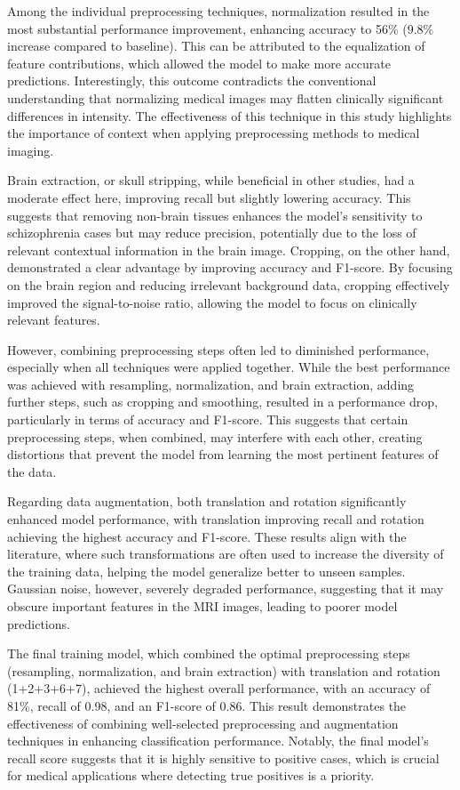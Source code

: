 Among the individual preprocessing techniques, normalization resulted in the most substantial performance improvement, enhancing accuracy to 56\% (9.8\% increase compared to baseline). This can be attributed to the equalization of feature contributions, which allowed the model to make more accurate predictions. Interestingly, this outcome contradicts the conventional understanding that normalizing medical images may flatten clinically significant differences in intensity. The effectiveness of this technique in this study highlights the importance of context when applying preprocessing methods to medical imaging.

Brain extraction, or skull stripping, while beneficial in other studies, had a moderate effect here, improving recall but slightly lowering accuracy. This suggests that removing non-brain tissues enhances the model's sensitivity to schizophrenia cases but may reduce precision, potentially due to the loss of relevant contextual information in the brain image. Cropping, on the other hand, demonstrated a clear advantage by improving accuracy and F1-score. By focusing on the brain region and reducing irrelevant background data, cropping effectively improved the signal-to-noise ratio, allowing the model to focus on clinically relevant features.

However, combining preprocessing steps often led to diminished performance, especially when all techniques were applied together. While the best performance was achieved with resampling, normalization, and brain extraction, adding further steps, such as cropping and smoothing, resulted in a performance drop, particularly in terms of accuracy and F1-score. This suggests that certain preprocessing steps, when combined, may interfere with each other, creating distortions that prevent the model from learning the most pertinent features of the data.

Regarding data augmentation, both translation and rotation significantly enhanced model performance, with translation improving recall and rotation achieving the highest accuracy and F1-score. These results align with the literature, where such transformations are often used to increase the diversity of the training data, helping the model generalize better to unseen samples. Gaussian noise, however, severely degraded performance, suggesting that it may obscure important features in the MRI images, leading to poorer model predictions.

The final training model, which combined the optimal preprocessing steps (resampling, normalization, and brain extraction) with translation and rotation (1+2+3+6+7), achieved the highest overall performance, with an accuracy of 81\%, recall of 0.98, and an F1-score of 0.86. This result demonstrates the effectiveness of combining well-selected preprocessing and augmentation techniques in enhancing classification performance. Notably, the final model's recall score suggests that it is highly sensitive to positive cases, which is crucial for medical applications where detecting true positives is a priority.


